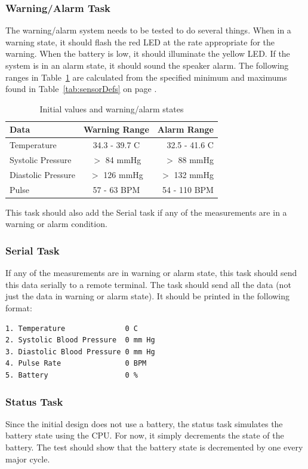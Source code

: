 \documentclass[12pt]{article} %
\begin{document}
    \subsubsection{Warning/Alarm Task} 
    The warning/alarm system needs to be tested to do several things. When in a
    warning state, it should flash the red LED at the rate appropriate for the
    warning. When the battery is low, it should illuminate the yellow LED. If the
    system is in an alarm state, it should sound the speaker alarm. The following
    ranges in Table~\ref{tab:ranges} are calculated from the specified minimum and
    maximums found in Table~\ref{tab:sensorDefs} on page \pageref{tab:sensorDefs}.
    \begin{table}[h]
      \centering
      \begin{tabular}{lcr} 
	\toprule
	Data & Warning Range & Alarm Range \\
	\midrule
	Temperature & 34.3 - 39.7 C & 32.5 - 41.6 C\\
	Systolic Pressure & $>$ 84 mmHg & $>$ 88 mmHg\\
	Diastolic Pressure & $>$ 126 mmHg & $>$ 132 mmHg\\
	Pulse & 57 - 63 BPM & 54 - 110 BPM \\
	\bottomrule
      \end{tabular}
      \caption{Initial values and warning/alarm states}
      \label{tab:ranges}
    \end{table}

    This task should also add the Serial task if any of the measurements are in
    a warning or alarm condition.

    \subsubsection{Serial Task}
    If any of the measurements are in warning or alarm state, this task should
    send this data serially to a remote terminal.  The task should send all the
    data (not just the data in warning or alarm state).  It should be printed in 
    the following format:

\begin{lstlisting}
1. Temperature              0 C
2. Systolic Blood Pressure  0 mm Hg
3. Diastolic Blood Pressure 0 mm Hg
4. Pulse Rate               0 BPM
5. Battery                  0 % 
\end{lstlisting}

    \subsubsection{Status Task}
    Since the initial design does not use a battery, the status task simulates the
    battery state using the CPU. For now, it simply decrements the state of the
    battery. The test should show that the battery state is decremented by one
    every major cycle.
\end{document}
